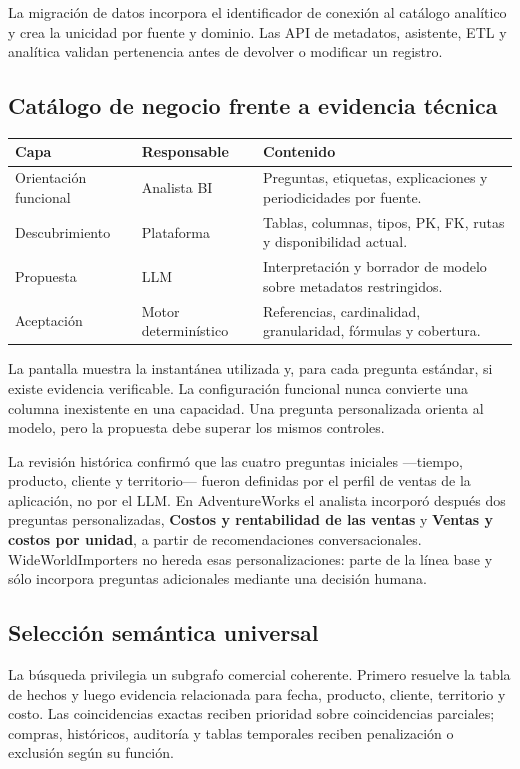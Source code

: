 \documentclass[11pt,letterpaper]{article}
\begin{document}
La migración de datos incorpora el identificador de conexión al catálogo analítico y crea
la unicidad por fuente y dominio. Las API de metadatos, asistente, ETL y analítica validan
pertenencia antes de devolver o modificar un registro.

\subsection{Catálogo de negocio frente a evidencia técnica}

\begin{tabularx}{\textwidth}{@{}p{}p{}X@{}}
  \toprule
  Capa & Responsable & Contenido \\
  \midrule
  Orientación funcional & Analista BI & Preguntas, etiquetas, explicaciones y periodicidades por fuente. \\
  Descubrimiento & Plataforma & Tablas, columnas, tipos, PK, FK, rutas y disponibilidad actual. \\
  Propuesta & LLM & Interpretación y borrador de modelo sobre metadatos restringidos. \\
  Aceptación & Motor determinístico & Referencias, cardinalidad, granularidad, fórmulas y cobertura. \\
  \bottomrule
\end{tabularx}

La pantalla muestra la instantánea utilizada y, para cada pregunta estándar, si existe
evidencia verificable. La configuración funcional nunca convierte una columna inexistente
en una capacidad. Una pregunta personalizada orienta al modelo, pero la propuesta debe
superar los mismos controles.

La revisión histórica confirmó que las cuatro preguntas iniciales ---tiempo, producto,
cliente y territorio--- fueron definidas por el perfil de ventas de la aplicación, no por
el LLM. En AdventureWorks el analista incorporó después dos preguntas personalizadas,
\textbf{Costos y rentabilidad de las ventas} y \textbf{Ventas y costos por unidad}, a partir
de recomendaciones conversacionales. WideWorldImporters no hereda esas personalizaciones:
parte de la línea base y sólo incorpora preguntas adicionales mediante una decisión humana.

\subsection{Selección semántica universal}

La búsqueda privilegia un subgrafo comercial coherente. Primero resuelve la tabla de hechos
y luego evidencia relacionada para fecha, producto, cliente, territorio y costo. Las
coincidencias exactas reciben prioridad sobre coincidencias parciales; compras, históricos,
auditoría y tablas temporales reciben penalización o exclusión según su función.
\end{document}
